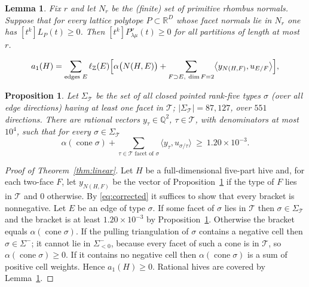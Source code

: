 \documentclass[10pt,a4paper]{amsart}
\newtheorem{lemma}{Lemma}
\newtheorem{proposition}{Proposition}
\newcommand{\Q}{\mathbb{Q}}
\newcommand{\R}{\mathbb{R}}
\newcommand{\Z}{\mathbb{Z}}
\DeclareMathOperator{\cone}{cone}
\newcommand{\lam}{\lambda}
\begin{document}
\begin{lemma}\label{lem:dilation}
Fix $r$ and let $N_r$ be the (finite) set of primitive rhombus normals. Suppose
that for every \emph{lattice} polytope $P\subset\R^{D}$ whose facet normals lie
in $N_r$ one has $[t^{k}]L_{P}(t)\ge 0$. Then $[t^{k}]P^{\nu}_{\lam\mu}(t)\ge 0$
for all partitions of length at most $r$.
\end{lemma}

\begin{equation}\label{eq:corrected}
  a_1(H)=\sum_{\text{edges }E}\ell_{\Z}(E)\Bigl[\alpha\bigl(N(H,E)\bigr)
  +\sum_{F\supset E,\ \dim F=2}\bigl\langle y_{N(H,F)},u_{E/F}\bigr\rangle\Bigr],
\end{equation}

\begin{proposition}\label{prop:certificate}
Let $\Sigma_{\mathcal T}$ be the set of all closed pointed rank-five types
$\sigma$ (over all edge directions) having at least one facet in $\mathcal T$;
$|\Sigma_{\mathcal T}|=87{,}127$, over $551$ directions. There are rational
vectors $y_\tau\in\Q^{2}$, $\tau\in\mathcal T$, with denominators at most
$10^{4}$, such that for every $\sigma\in\Sigma_{\mathcal T}$
\[
  \alpha(\cone\sigma)+\sum_{\tau\in\mathcal T\text{ facet of }\sigma}
  \langle y_\tau,u_{\sigma/\tau}\rangle\ \ge\ 1.20\times10^{-3}.
\]
\end{proposition}

\begin{proof}[Proof of Theorem~\ref{thm:linear}]
Let $H$ be a full-dimensional five-part hive and, for each two-face $F$, let
$y_{N(H,F)}$ be the vector of Proposition~\ref{prop:certificate} if the type of
$F$ lies in $\mathcal T$ and $0$ otherwise. By \eqref{eq:corrected} it suffices
to show that every bracket is nonnegative. Let $E$ be an edge of type $\sigma$.
If some facet of $\sigma$ lies in $\mathcal T$ then $\sigma\in\Sigma_{\mathcal T}$
and the bracket is at least $1.20\times10^{-3}$ by
Proposition~\ref{prop:certificate}. Otherwise the bracket equals
$\alpha(\cone\sigma)$. If the pulling triangulation of $\sigma$ contains a
negative cell then $\sigma\in\Sigma^{-}$; it cannot lie in $\Sigma^{-}_{<0}$,
because every facet of such a cone is in $\mathcal T$, so
$\alpha(\cone\sigma)\ge0$. If it contains no negative cell then
$\alpha(\cone\sigma)$ is a sum of positive cell weights. Hence $a_1(H)\ge0$.
Rational hives are covered by Lemma~\ref{lem:dilation}.
\end{proof}
\end{document}
